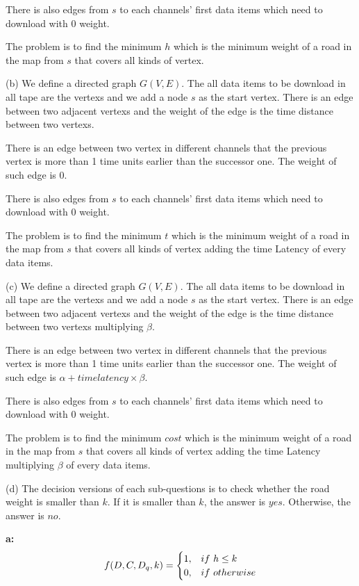 \documentclass[12pt,a4paper]{article}
\theoremstyle{definition}
\begin{document}
\begin{enumerate}
There is also edges from $s$ to each channels' first data items which need to download with 0 weight.

The problem is to find the minimum $h$ which is the minimum weight of a road in the map from $s$ that covers all kinds of vertex.

(b) We define a directed graph $G(V,E)$. The all data items to be download in all tape are the vertexs and we add a node $s$ as the start vertex. There is an edge between two adjacent vertexs and  the weight of the edge is the time distance between two vertexs.

There is an edge between two vertex in different channels that the previous vertex is more than 1 time units earlier than the successor one. The weight of such edge is 0.

There is also edges from $s$ to each channels' first data items which need to download with 0 weight.

The problem is to find the minimum $t$ which is the minimum weight of a road in the map from $s$ that covers all kinds of vertex adding the time Latency of every data items.

(c) We define a directed graph $G(V,E)$. The all data items to be download in all tape are the vertexs and we add a node $s$ as the start vertex. There is an edge between two adjacent vertexs and  the weight of the edge is the time distance between two vertexs multiplying $\beta$.

There is an edge between two vertex in different channels that the previous vertex is more than 1 time units earlier than the successor one. The weight of such edge is $\alpha+time latency\times \beta$.

There is also edges from $s$ to each channels' first data items which need to download with 0 weight.

The problem is to find the minimum $cost$ which is the minimum weight of a road in the map from $s$ that covers all kinds of vertex adding the time Latency multiplying $\beta$ of every data items.

(d) The decision versions of each sub-questions is to check whether the road weight is smaller than $k$. If it is smaller than $k$, the answer is $yes$. Otherwise, the answer is $no$.

\textbf{a:}
\begin{eqnarray}f(D,C,D_q,k)=
	\begin{cases}
	1, &if\ h\le k\cr 
	0, &if\ otherwise
	\end{cases}
	\end{eqnarray}


\end{enumerate}
\end{document}
